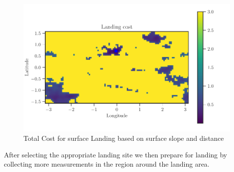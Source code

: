 \begin{figure}[htbp]
    \centering
    \includegraphics[width=\textwidth,keepaspectratio]{figures/computational_geometry/dynamic_exploration/castalia/refine/cost.pdf}
    \caption{Total Cost for surface Landing based on surface slope and distance\label{fig:landing_site_cost}}
\end{figure}
After selecting the appropriate landing site we then prepare for landing by collecting more measurements in the region around the landing area.

